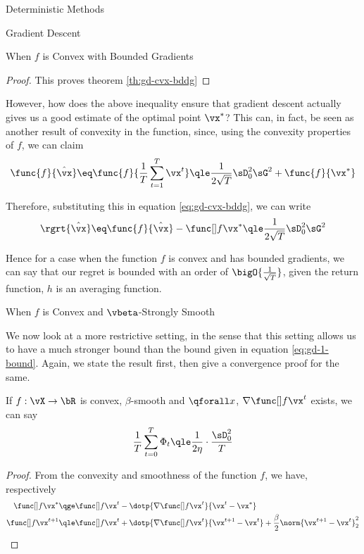 \documentclass{article}
\begin{document}
\begin{psection}{Deterministic Methods}
\begin{psubsection}{Gradient Descent}
\begin{pssubsection}{When $f$ is Convex with Bounded Gradients}
\begin{theorem}
\begin{proof}
					This proves theorem \ref{th:gd-cvx-bddg}
				\end{proof}
			\end{theorem}

			However, how does the above inequality ensure that gradient descent actually gives us a good estimate of the optimal point $\xs$? This can, in fact, be seen as another result of convexity in the function, since, using the convexity properties of $f$, we can claim
			\begin{align*}
				\func{f}{\hat{\vx}} \eq \func{f}{\frac{1}{T} \sum_{t = 1}^T \x{t}}	\qle	\frac{1}{2\sqrt{T}} \sD_0^2 \sG^2 + \func{f}{\xs}
			\end{align*}

			Therefore, substituting this in equation \ref{eq:gd-cvx-bddg}, we can write
			\begin{equation}
				\rgrt{\hat{\vx}} \eq \func{f}{\hat{\vx}} - \fs	\qle	\frac{1}{2\sqrt{T}} \sD_0^2 \sG^2
				\label{eq:gd-1-bound}
			\end{equation}

			Hence for a case when the function $f$ is convex and has bounded gradients, we can say that our regret is bounded with an order of $\bigO{\frac{1}{\sqrt{T}}}$, given the return function, \ie $h$ is an averaging function.

		\end{pssubsection}

		\begin{pssubsection}{When $f$ is Convex and $\vbeta$-Strongly Smooth}

			We now look at a more restrictive setting, in the sense that this setting allows us to have a much stronger bound than the bound given in equation \ref{eq:gd-1-bound}. Again, we state the result first, then give a convergence proof for the same. \sbr

			\begin{theorem}
				If $f : \vX \to \bR$ is convex, $\beta$-smooth and $\qforall x$, $\gf{t}$ exists, we can say
				\begin{align}
					\frac{1}{T} \sum_{t = 0}^T \Phi_t	\qle	\frac{1}{2 \eta} \cdot \frac{\sD_0^2}{T}
					\label{eq:gd-cvx-bsm}
				\end{align}
				\label{th:gd-cvx-bsm}

				\begin{proof}
					From the convexity and smoothness of the function $f$, we have, respectively
					\begin{align}
						\fs			&\qge	\f{t} - \dotp{\gf{t}}{\x{t} - \xs} \label{eq:gd2-beta} \\
						\f{t + 1}	&\qle	\f{t} + \dotp{\gf{t}}{\x{t + 1} - \x{t}} + \frac{\beta}{2} \norm{\x{t + 1} - \x{t}}_2^2 \nonumber
					\end{align}


\end{proof}
\end{theorem}
\end{pssubsection}
\end{psubsection}
\end{psection}
\end{document}
